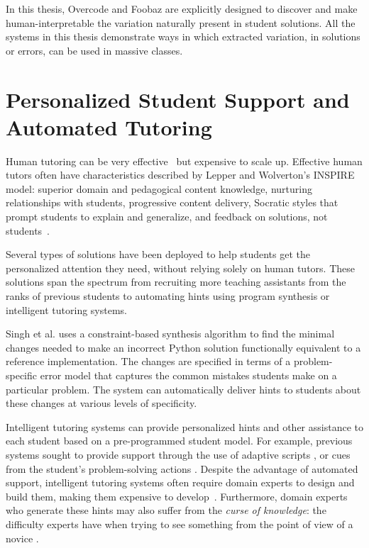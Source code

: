In this thesis, Overcode and Foobaz are explicitly designed to discover and make human-interpretable the variation naturally present in student solutions. All the systems in this thesis demonstrate ways in which extracted variation, in solutions or errors, can be used in massive classes. 

\section{Personalized Student Support and Automated Tutoring}
Human tutoring can be very effective~\cite{bloom} but expensive to scale up. Effective human tutors often have characteristics described by Lepper and Wolverton's INSPIRE model: superior domain and pedagogical content knowledge, nurturing relationships with students, progressive content delivery, Socratic styles that prompt students to explain and generalize, and feedback on solutions, not students~\cite{wood2012role}.

Several types of solutions have been deployed to help students get the personalized attention they need, without relying solely on human tutors. These solutions span the spectrum from recruiting more teaching assistants from the ranks of previous students \cite{communityTAs} to automating hints using program synthesis or intelligent tutoring systems. 

Singh et al. \cite{rishabh} uses a constraint-based synthesis algorithm to find the minimal changes needed to make an incorrect Python solution functionally equivalent to a reference implementation. The changes are specified in terms of a problem-specific error model that captures the common mistakes students make on a particular problem. The system can automatically deliver hints to students about these changes at various levels of specificity. 

Intelligent tutoring systems can provide personalized hints and other assistance to each student based on a pre-programmed student model. For example, previous systems sought to provide support through the use of adaptive scripts \cite{kumar2007tutorial}, or cues from the student's problem-solving actions \cite{diziol}. Despite the advantage of automated support, intelligent tutoring systems often require domain experts to design and build them, making them expensive to develop~\cite{gross2012feedback}. Furthermore, domain experts who generate these hints may also suffer from the {\it curse of knowledge}: the difficulty experts have when trying to see something from the point of view of a novice \cite{curse}. 

